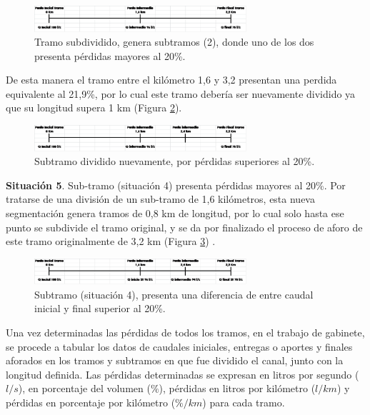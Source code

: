 \documentclass[]{article}
\begin{document}
\begin{figure}[H]
\centering
\includegraphics[width=0.7\textwidth]{images/sit_4.eps}
\caption{Tramo subdividido, genera subtramos (2), donde uno de los dos presenta pérdidas mayores al 20\%.}
\label{sit_4}
\end{figure}

De esta manera el tramo entre el kilómetro 1,6 y 3,2 presentan una perdida equivalente al 21,9\%, por lo cual este tramo debería ser nuevamente dividido ya que su longitud supera 1 km (Figura \ref{sit_4_1}).\\

\begin{figure}[H]
\centering
\includegraphics[width=0.7\textwidth]{images/sit_4_1.eps}
\caption{Subtramo dividido nuevamente, por pérdidas superiores al 20\%.}
\label{sit_4_1}
\end{figure}

\textbf{Situación 5}. Sub-tramo (situación 4) presenta pérdidas mayores al 20\%. Por tratarse de una división de un sub-tramo de 1,6 kilómetros, esta nueva segmentación genera tramos de 0,8 km de longitud, por lo cual solo hasta ese punto se subdivide el tramo original, y se da por finalizado el proceso de aforo de este tramo originalmente de 3,2 km (Figura \ref{sit_5}) .\\

\begin{figure}[H]
\centering
\includegraphics[width=0.7\textwidth]{images/sit_5.eps}
\caption{Subtramo (situación 4), presenta una diferencia de entre caudal inicial y final superior al 20\%.}
\label{sit_5}
\end{figure}

Una vez determinadas las pérdidas de todos los tramos, en el trabajo de gabinete, se procede a tabular los datos de caudales iniciales, entregas o aportes y finales aforados en los tramos y subtramos en que fue dividido el canal, junto con la longitud definida. Las pérdidas determinadas se expresan en litros por segundo ($l/s$), en porcentaje del volumen ($\%$), pérdidas en litros por kilómetro ($l/km$) y pérdidas en porcentaje por kilómetro ($\%/km$) para cada tramo.
\end{document}
